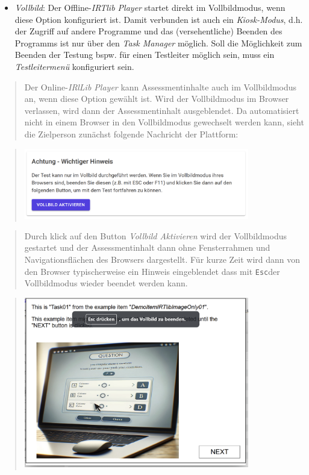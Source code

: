\documentclass[
  letterpaper,
  DIV=11]{scrreprt}
\providecommand{\tightlist}{%
  \setlength{\itemsep}{0pt}\setlength{\parskip}{0pt}}\usepackage{longtable,booktabs,array}
\begin{document}
\begin{tcolorbox}
\begin{itemize}
\tightlist
\item
  \emph{Vollbild}: Der Offline-\emph{IRTlib Player} startet direkt im
  Vollbildmodus, wenn diese Option konfiguriert ist. Damit verbunden ist
  auch ein \emph{Kiosk-Modus}, d.h. der Zugriff auf andere Programme und
  das (versehentliche) Beenden des Programms ist nur über den \emph{Task
  Manager} möglich. Soll die Möglichkeit zum Beenden der Testung bspw.
  für einen Testleiter möglich sein, muss ein \emph{Testleitermenü}
  konfiguriert sein.
\end{itemize}

\begin{quote}
Der Online-\emph{IRlLib Player} kann Assessmentinhalte auch im
Vollbildmodus an, wenn diese Option gewählt ist. Wird der Vollbildmodus
im Browser verlassen, wird dann der Assessmentinhalt ausgeblendet. Da
automatisiert nicht in einem Browser in den Vollbildmodus gewechselt
werden kann, sieht die Zielperson zunächst folgende Nachricht der
Plattform:
\end{quote}

\begin{quote}
\includegraphics[width=0.8\textwidth,height=\textheight]{img/screenshot-irtlib-player-message-fullscreen-not-started-DEU.png}
\end{quote}

\begin{quote}
Durch klick auf den Button \emph{Vollbild Aktivieren} wird der
Vollbildmodus gestartet und der Assessmentinhalt dann ohne Fensterrahmen
und Navigationsflächen des Browsers dargestellt. Für kurze Zeit wird
dann von den Browser typischerweise ein Hinweis eingeblendet dass mit
\texttt{Esc}der Vollbildmodus wieder beendet werden kann.
\end{quote}

\begin{quote}
\includegraphics[width=0.8\textwidth,height=\textheight]{img/screenshot-irtlib-player-message-fullscreen-notification-DEU.png}
\end{quote}


\end{tcolorbox}
\end{document}
